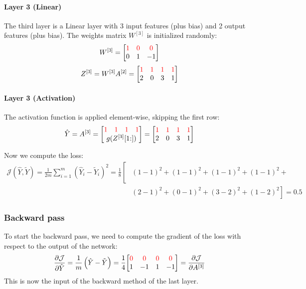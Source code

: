 \paragraph{Layer 3 (Linear)} The third layer is a Linear layer with 3 input features (plus bias) and 2 output features (plus bias). The weights matrix $W^{[3]}$ is initialized randomly:
\begin{equation*}
    W^{[3]} = \mqty[
        \color{red} 1 & \color{red} 0 & \color{red} 0 \\
        0 & 1 & -1
    ]
\end{equation*}
\begin{equation*}
    Z^{[3]} = W^{[3]} A^{[2]} = \mqty[
        \color{red} 1 & \color{red} 1 & \color{red} 1 & \color{red} 1 \\
        2 & 0 & 3 & 1
    ]
\end{equation*}

\paragraph{Layer 3 (Activation)} The activation function is applied element-wise, skipping the first row:
\begin{equation*}
    \hat{Y} = A^{[3]} = \mqty[
        \mqty{\color{red} 1 & \color{red} 1 & \color{red} 1 & \color{red} 1} \\
        g(Z^{[3]}[1\hspace{-0.6ex}:])
    ] = \mqty[
        \color{red} 1 & \color{red} 1 & \color{red} 1 & \color{red} 1 \\
        2 & 0 & 3 & 1
    ]
\end{equation*}

Now we compute the loss:
\begin{align*}
    \mathcal{J}(\hat{Y}, \tilde{Y}) = \frac{1}{2m} \sum_{i=1}^{m} (\hat{Y}_i - \tilde{Y}_i)^2 = \frac{1}{8} \left[\right.&(1 - 1)^2 + (1 - 1)^2 + (1 - 1)^2 + (1 - 1)^2 + \\
        &(2-1)^2 + (0-1)^2 + (3-2)^2 + (1-2)^2\left.\right] = 0.5
\end{align*}

\subsubsection{Backward pass}
To start the backward pass, we need to compute the gradient of the loss with respect to the output of the network:
\begin{equation*}
    \frac{\partial \mathcal{J}}{\partial \hat{Y}} = \frac{1}{m} \left(\hat{Y} - \tilde{Y}\right) = \frac{1}{4} \mqty[
        \color{red} 0 & \color{red} 0 & \color{red} 0 & \color{red} 0 \\
        1 & -1 & 1 & -1
    ] = \pdv{\mathcal{J}}{A^{[3]}}
\end{equation*}
This is now the input of the backward method of the last layer.

